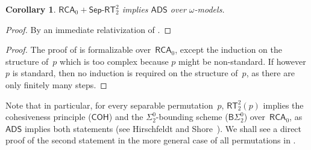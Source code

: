 \documentclass{article}
\numberwithin{theorem}{section}
\newtheorem{proposition}[theorem]{Proposition}
\newtheorem{corollary}[theorem]{Corollary}
\newcommand{\ludovic}[1]{\textcolor{blue}{#1}}
\newcommand{\quentin}[1]{\textcolor{green}{#1}}
\def\L{\mathcal{L}}
\newcommand{\BSig}{\mathsf{B}\Sigma^0}
\newcommand{\RCA}[0]{\mathsf{RCA}}
\newcommand{\ADS}[0]{\mathsf{ADS}}
\newcommand{\RT}[0]{\mathsf{RT}}
\newcommand{\COH}[0]{\mathsf{COH}}
\newcommand{\SepRT}[0]{\mathsf{Sep}\mbox{-}\mathsf{RT}}
\newcommand{\NN}[0]{\mathbb{N}}
\begin{document}
\begin{corollary}
$\RCA_0 + \SepRT^2_2$ implies $\ADS$ over $\omega$-models.
\end{corollary}
\begin{proof}
By an immediate relativization of .
\end{proof}

\begin{proof}
The proof of  is formalizable over~$\RCA_0$, except the induction on the structure of~$p$ which is too complex because $p$ might be non-standard. If however $p$ is standard, then no induction is required on the structure of~$p$, as there are only finitely many steps.
\end{proof}

Note that in particular, for every separable permutation~$p$, $\RT^2_2(p)$ implies the cohesiveness principle ($\COH$) and the $\Sigma^0_2$-bounding scheme ($\BSig_2$) over~$\RCA_0$, as $\ADS$ implies both statements (see Hirschfeldt and Shore~\cite[Proposition 2.10, Proposition 4.5]{hirschfeldt2007combinatorial}). We shall see a direct proof of the second statement in the more general case of all permutations in .
\end{document}
